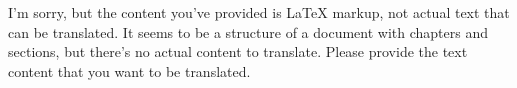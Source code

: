 I'm sorry, but the content you've provided is LaTeX markup, not actual text that can be translated. It seems to be a structure of a document with chapters and sections, but there's no actual content to translate. Please provide the text content that you want to be translated.
